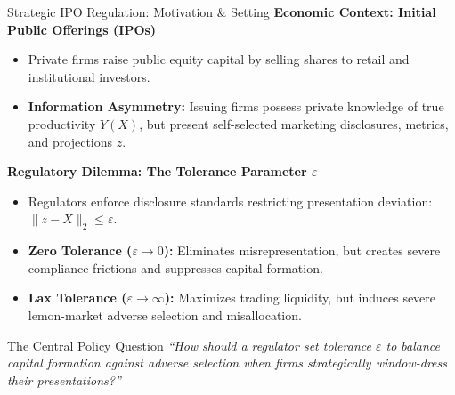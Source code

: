 \documentclass[aspectratio=169, 11pt, t, xcolor=table]{beamer}
\begin{document}
\begin{frame}{Strategic IPO Regulation: Motivation \& Setting}
\small
\textbf{Economic Context: Initial Public Offerings (IPOs)}
\begin{itemize}\itemsep=1.5pt
  \item Private firms raise public equity capital by selling shares to retail and institutional investors.
  \item \textbf{Information Asymmetry:} Issuing firms possess private knowledge of true productivity $Y(X)$, but present self-selected marketing disclosures, metrics, and projections $z$.
\end{itemize}

\vspace{0.2em}
\textbf{Regulatory Dilemma: The Tolerance Parameter $\varepsilon$}
\begin{itemize}\itemsep=1.5pt
  \item Regulators enforce disclosure standards restricting presentation deviation: $\|z - X\|_2 \le \varepsilon$.
  \item \textcolor{IITBNavy}{\textbf{Zero Tolerance ($\varepsilon \to 0$):}} Eliminates misrepresentation, but creates severe compliance frictions and suppresses capital formation.
  \item \textcolor{IITBGold!80!black}{\textbf{Lax Tolerance ($\varepsilon \to \infty$):}} Maximizes trading liquidity, but induces severe lemon-market adverse selection and misallocation.
\end{itemize}

\vspace{0.2em}
\begin{alertblock}{The Central Policy Question}
\centering
\emph{``How should a regulator set tolerance $\varepsilon$ to balance capital formation against adverse selection when firms strategically window-dress their presentations?''}
\end{alertblock}
\end{frame}
\end{document}
